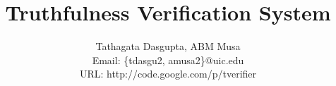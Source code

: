 \documentclass[11pt]{article}
\begin{document}
\title{Truthfulness Verification System}

\author{
Tathagata Dasgupta, ABM Musa\\
Email: \{tdasgu2, amusa2\}@uic.edu\\
URL: http://code.google.com/p/tverifier }

\date{}
\maketitle


%
%
%
%
\end{document}
